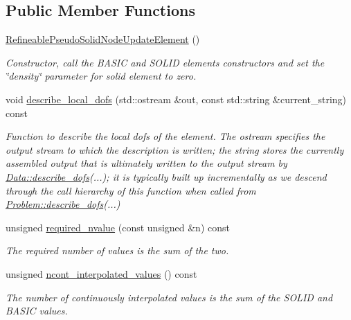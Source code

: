 \subsection*{Public Member Functions}
\begin{DoxyCompactItemize}
\item 
\hyperlink{classoomph_1_1RefineablePseudoSolidNodeUpdateElement_a5d066a14376949c5a0d598ad2edbf179}{Refineable\+Pseudo\+Solid\+Node\+Update\+Element} ()
\begin{DoxyCompactList}\small\item\em Constructor, call the B\+A\+S\+IC and S\+O\+L\+ID elements\textquotesingle{} constructors and set the \char`\"{}density\char`\"{} parameter for solid element to zero. \end{DoxyCompactList}\item 
void \hyperlink{classoomph_1_1RefineablePseudoSolidNodeUpdateElement_ae8d1530df547c5d697c640d45cb6c941}{describe\+\_\+local\+\_\+dofs} (std\+::ostream \&out, const std\+::string \&current\+\_\+string) const
\begin{DoxyCompactList}\small\item\em Function to describe the local dofs of the element. The ostream specifies the output stream to which the description is written; the string stores the currently assembled output that is ultimately written to the output stream by \hyperlink{classoomph_1_1Data_a2dae16e2dcff9a40029f834c83364df5}{Data\+::describe\+\_\+dofs}(...); it is typically built up incrementally as we descend through the call hierarchy of this function when called from \hyperlink{classoomph_1_1Problem_abc103804eb319ae0b3d43870cc3e1eaf}{Problem\+::describe\+\_\+dofs}(...) \end{DoxyCompactList}\item 
unsigned \hyperlink{classoomph_1_1RefineablePseudoSolidNodeUpdateElement_af1d5e0fb32d61d553eba93b705ec0052}{required\+\_\+nvalue} (const unsigned \&n) const
\begin{DoxyCompactList}\small\item\em The required number of values is the sum of the two. \end{DoxyCompactList}\item 
unsigned \hyperlink{classoomph_1_1RefineablePseudoSolidNodeUpdateElement_a4384a23bbf41dd44ccc2c64579cdd03b}{ncont\+\_\+interpolated\+\_\+values} () const
\begin{DoxyCompactList}\small\item\em The number of continuously interpolated values is the sum of the S\+O\+L\+ID and B\+A\+S\+IC values. \end{DoxyCompactList}\item 

\end{DoxyCompactItemize}
